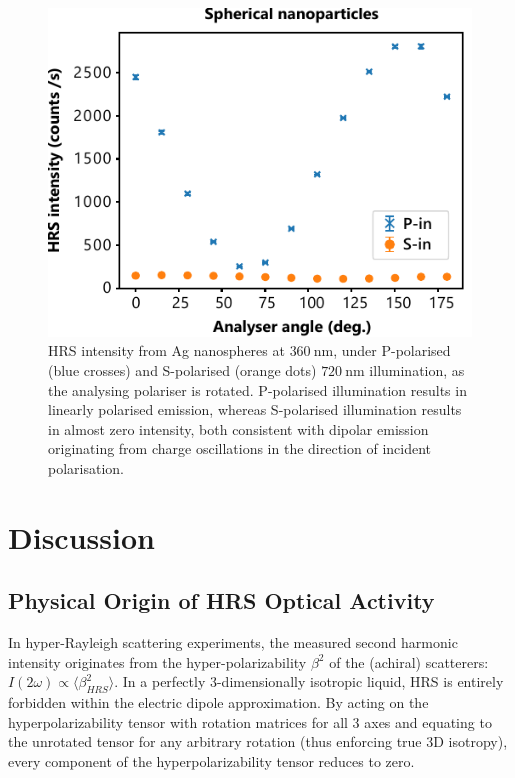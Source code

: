 \begin{figure}[htb!]	
    \centering	
    \includegraphics[scale=1.0]{./figures/results/HRS/hrs_spheres.pdf}
    \caption{\label{fig:results:HRS:hrs_spheres}
    HRS intensity from Ag nanospheres at $\SI{360}{\nano\m}$, under P-polarised (blue crosses) and S-polarised (orange dots) $\SI{720}{\nano\m}$ illumination, as the analysing polariser is rotated. P-polarised illumination results in linearly polarised emission, whereas S-polarised illumination results in almost zero intensity, both consistent with dipolar emission originating from charge oscillations in the direction of incident polarisation.}	
\end{figure}

\section{Discussion}

\subsection{Physical Origin of HRS Optical Activity}
In hyper-Rayleigh scattering experiments, the measured second harmonic intensity originates from the hyper-polarizability $\beta^{2}$ of the (achiral) scatterers: $I(2\omega) \propto \langle \beta^{2}_{HRS} \rangle$.
In a perfectly 3-dimensionally isotropic liquid, HRS is entirely forbidden within the electric dipole approximation. By acting on the hyperpolarizability tensor with rotation matrices for all 3 axes and equating to the unrotated tensor for any arbitrary rotation (thus enforcing true 3D isotropy), every component of the hyperpolarizability tensor reduces to zero.

